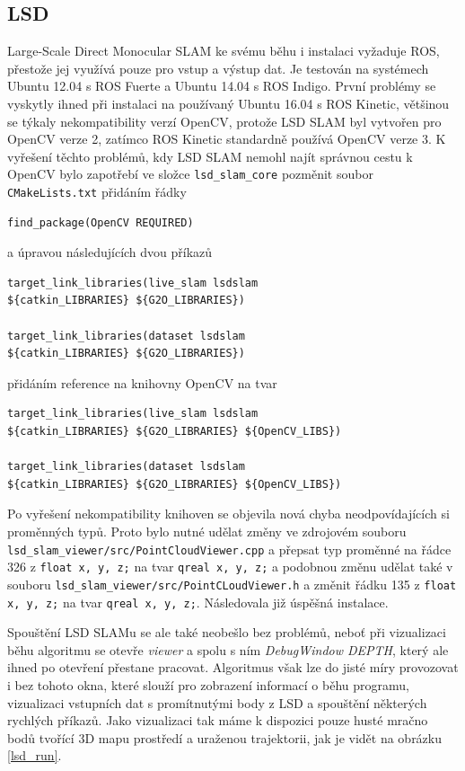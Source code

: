 \documentclass[12pt,a4paper]{report}
\begin{document}
\subsection{LSD}
Large-Scale Direct Monocular SLAM ke svému běhu i instalaci vyžaduje ROS, přestože jej využívá pouze pro vstup a výstup dat. Je testován na systémech Ubuntu 12.04 s ROS Fuerte a Ubuntu 14.04 s ROS Indigo. První problémy se vyskytly ihned při instalaci na používaný Ubuntu 16.04 s ROS Kinetic, většinou se týkaly nekompatibility verzí OpenCV, protože LSD SLAM byl vytvořen pro OpenCV verze 2, zatímco ROS Kinetic standardně používá OpenCV verze 3. K vyřešení těchto problémů, kdy LSD SLAM nemohl najít správnou cestu k OpenCV bylo zapotřebí ve složce \texttt{lsd\_slam\_core} pozměnit soubor \texttt{CMakeLists.txt} přidáním řádky
\begin{verbatim}
find_package(OpenCV REQUIRED)
\end{verbatim}
a úpravou následujících dvou příkazů
\begin{verbatim}
target_link_libraries(live_slam lsdslam 
${catkin_LIBRARIES} ${G2O_LIBRARIES})

target_link_libraries(dataset lsdslam 
${catkin_LIBRARIES} ${G2O_LIBRARIES})
\end{verbatim}
přidáním reference na knihovny OpenCV na tvar
\begin{verbatim}
target_link_libraries(live_slam lsdslam 
${catkin_LIBRARIES} ${G2O_LIBRARIES} ${OpenCV_LIBS})

target_link_libraries(dataset lsdslam 
${catkin_LIBRARIES} ${G2O_LIBRARIES} ${OpenCV_LIBS})
\end{verbatim}

Po vyřešení nekompatibility knihoven se objevila nová chyba neodpovídajících si \newline proměnných typů. Proto bylo nutné udělat změny ve zdrojovém souboru \newline \texttt{lsd\_slam\_viewer/src/PointCloudViewer.cpp} a přepsat typ proměnné na řádce 326 z \texttt{float x, y, z;} na tvar \texttt{qreal x, y, z;} a podobnou změnu udělat také v souboru \texttt{lsd\_slam\_viewer/src/PointCLoudViewer.h} a změnit řádku 135 z \texttt{float x, y, z;} na tvar \texttt{qreal x, y, z;}. Následovala již úspěšná instalace.

Spouštění LSD SLAMu se ale také neobešlo bez problémů, neboť při vizualizaci běhu algoritmu se otevře \textit{viewer} a spolu s ním \textit{DebugWindow DEPTH}, který ale ihned po otevření přestane pracovat. Algoritmus však lze do jisté míry provozovat i bez tohoto okna, které slouží pro zobrazení informací o běhu programu, vizualizaci vstupních dat s promítnutými body z LSD a spouštění některých rychlých příkazů. Jako vizualizaci tak máme k dispozici pouze husté mračno bodů tvořící 3D mapu prostředí a uraženou trajektorii, jak je vidět na obrázku \ref{lsd_run}.
\end{document}
